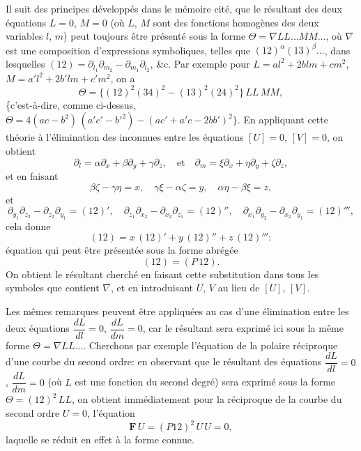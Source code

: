 \documentclass[12pt,a4paper]{article}
\theoremstyle{plain}
\begin{document}
Il suit des principes d\'evelopp\'es dans le m\'emoire cit\'e, que le r\'esultant des deux \'equations $L = 0$, $M = 0$ (o\`u $L$, $M$ sont des fonctions homog\`enes des deux variables $l$, $m$) peut toujours \^etre pr\'esent\'e sous la forme $\Theta = \nabla LL \ldots MM \ldots$, o\`u $\nabla$ est une composition d'expressions symboliques, telles que $(12)^{\alpha} (13)^{\beta} \ldots$, dans lesquelles $(12) = \partial_{l_1} \partial_{m_2} - \partial_{m_1} \partial_{l_2}$, \&c. Par exemple pour $L = al^2 + 2blm + cm^2$, $M = a'l^2 + 2b'lm + c'm^2$, on a
\[
\Theta = \{(12)^2 (34)^2 - (13)^2 (24)^2\}\, LL\, MM,
\]
\{c'est-\`a-dire, comme ci-dessus, $\Theta = 4(ac - b^2)\,(a'c' - b'^2) - (ac' + a'c - 2bb')^2\}$. En appliquant cette th\'eorie \`a l'\'elimination des inconnues entre les \'equations $[U] = 0$, $[V] = 0$, on obtient
\[
\partial_l = \alpha \partial_x + \beta \partial_y + \gamma \partial_z, \quad \text{et} \quad \partial_m = \xi \partial_x + \eta \partial_y + \zeta \partial_z,
\]
et en faisant
\[
\beta\zeta - \gamma\eta = x, \quad \gamma\xi - \alpha\zeta = y, \quad \alpha\eta - \beta\xi = z,
\]
et
\[
\partial_{y_1} \partial_{z_2} - \partial_{z_2} \partial_{y_1} = (12)', \quad \partial_{z_1} \partial_{x_2} - \partial_{x_2} \partial_{z_1} = (12)'', \quad \partial_{x_1} \partial_{y_2} - \partial_{x_2} \partial_{y_1} = (12)''',
\]
cela donne
\[
(12) = x\,(12)' + y\,(12)'' + z\,(12)''':
\]
\'equation qui peut \^etre pr\'esent\'ee sous la forme abr\'eg\'ee
\[
(12) = (P\,12).
\]
On obtient le r\'esultant cherch\'e en faisant cette substitution dans tous les symboles que contient $\nabla$, et en introduisant $U$, $V$ au lieu de $[U]$, $[V]$.

Les m\^emes remarques peuvent \^etre appliqu\'ees au cas d'une \'elimination entre les deux \'equations $\dfrac{dL}{dl} = 0$, $\dfrac{dL}{dm} = 0$, car le r\'esultant sera exprim\'e ici sous la m\^eme forme $\Theta = \nabla LL \ldots$. Cherchons par exemple l'\'equation de la polaire r\'eciproque d'une courbe du second ordre: en observant que le r\'esultant des \'equations $\dfrac{dL}{dl} = 0$, $\dfrac{dL}{dm} = 0$ (o\`u $L$ est une fonction du second degr\'e) sera exprim\'e sous la forme $\Theta = (12)^2\, LL$, on obtient imm\'ediatement pour la r\'eciproque de la courbe du second ordre $U = 0$, l'\'equation
\[
\mathbf{F}\,U = (P12)^2\, U\,U = 0,
\]
laquelle se r\'eduit en effet \`a la forme connue.
\end{document}
